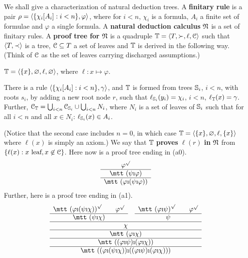We shall give a characterization of natural deduction trees.
A \textbf{finitary rule} is a pair $\rho = \langle \{\chi_i[A_i] : i < n\},
\varphi\rangle$, where for $i < n$, $\chi_i$ is a formula, $A_i$ a finite
set of formulae and $\varphi$ a single formula. A \textbf{natural
deduction calculus} 
$\mathfrak{N}$ is a set of finitary rules. A \textbf{proof tree for} 
$\mathfrak{N}$ is a quadruple $\mathbb{T} = \langle T, \succ, \ell, \mathcal{C}\rangle$ such that
$\langle T, \prec\rangle$ is a tree, $\mathcal{C} \subseteq T$
a set of leaves and $\mathbb{T}$ is derived in the following way.
(Think of $\mathcal{C}$ as the set of leaves carrying discharged
assumptions.)
\begin{dinglist}{43}
\item
$\mathbb{T} = \langle \{x\}, \varnothing, \ell, \varnothing\rangle$,
where $\ell \colon x \mapsto \varphi$.
\item
There is a rule $\langle \{\chi_i[A_i] : i < n\}, \gamma\rangle$, and
$\mathbb{T}$ is formed from trees $\mathbb{S}_i$, $i < n$, with roots
$s_i$, by adding a new root node $r$, such that
$\ell_{\mathbb{S}_i}(y_i) = \chi_i$, $i < n$, $\ell_{\mathbb{T}}(x) =
\gamma$. Further, $\mathcal{C}_{\mathbb{T}} = \bigcup_{i < n} \mathcal{C}_{\mathbb{S}_i} \cup
\bigcup_{i < n} N_i$, where $N_i$ is a set of leaves
of $\mathbb{S}_i$ such that for all $i < n$ and all $x \in N_i$:
$\ell_{\mathbb{S}_i}(x) \in A_i$.
\end{dinglist}
(Notice that the second case includes $n = 0$, in which case
$\mathbb{T} = \langle \{x\}, \varnothing, \ell, \{x\}\rangle$ where
$\ell(x)$ is simply an axiom.) We say that $\mathbb{T}$ \textbf{proves}
$\ell(r)$ \textbf{in} $\mathfrak{N}$ from $\{\ell(x) : x \mbox{ leaf}, x
\not\in \mathcal{C}\}$. Here now is a proof tree ending in (a0).
\begin{equation}
\begin{array}{c}
\varphi^{\surd} \\\hline
\mbox{\mtt ($\psi$\symbol{25}$\varphi$)} \\\hline
\mbox{\mtt ($\varphi$\symbol{25}($\psi$\symbol{25}$\varphi$))}
\end{array}
\end{equation}
Further, here is a proof tree ending in (a1).
\begin{equation}
\begin{array}{ccc}
\mbox{\mtt ($\varphi$\symbol{25}($\psi$\symbol{25}$\chi$))}^{\surd}
    \qquad \varphi^{\surd} &
    & \mbox{\mtt ($\phi$\symbol{25}$\psi$)}^{\surd} \qquad \phi^{\surd}
    \\\cline{1-1}\cline{3-3}
\mbox{\mtt ($\psi$\symbol{25}$\chi$)} & & \psi \\\cline{1-3}
\multicolumn{3}{c}{\chi} \\\hline
\multicolumn{3}{c}{\mbox{\mtt ($\varphi$\symbol{25}$\chi$)}} \\\hline
\multicolumn{3}{c}{\mbox{\mtt (($\varphi$\symbol{25}$\psi$)\symbol{25}%
($\varphi$\symbol{25}$\chi$))}} \\\hline
\multicolumn{3}{c}{\mbox{\mtt (($\varphi$\symbol{25}($\psi$\symbol{25}%
$\chi$))\symbol{25}(($\varphi$\symbol{25}$\psi$)\symbol{25}(%
$\varphi$\symbol{25}$\chi$)))}}
\end{array}
\end{equation}
